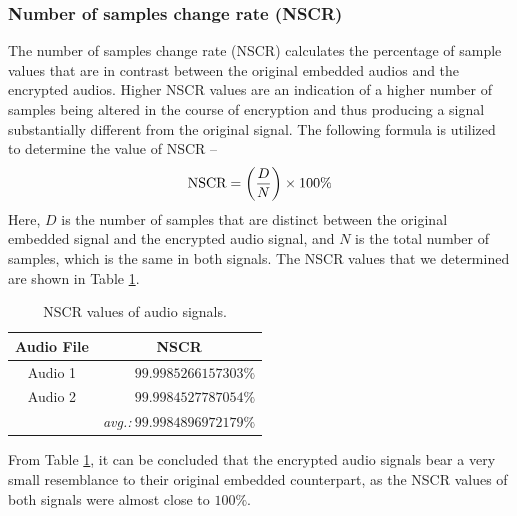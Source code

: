 \documentclass[a4paper]{cas-sc}
\begin{document}
\subsubsection{Number of samples change rate (NSCR)}
The number of samples change rate (NSCR) calculates the percentage of sample values that are in contrast between the original embedded audios and the encrypted audios. Higher NSCR values are an indication of a higher number of samples being altered in the course of encryption and thus producing a signal substantially different from the original signal. The following formula is utilized to determine the value of NSCR --
\begin{equation}
    \textcolor{black}{\text{NSCR}=\left(\frac{D}{N}\right)\times100\%}
\end{equation}
Here, $D$ is the number of samples that are distinct between the original embedded signal and the encrypted audio signal, and $N$ is the total number of samples, which is the same in both signals. The NSCR values that we determined are shown in Table \ref{table:nscr}.
\begin{table}[pos=h]
    \begin{center}
        \caption{NSCR values of audio signals.}
        \begin{tabular}{cr}
            \hline
            \multicolumn{1}{c|}{Audio File} & \multicolumn{1}{c}{NSCR}                     \\ \hline
            \multicolumn{1}{c|}{Audio 1}    & $99.9985266157303\%$                         \\ %
            \multicolumn{1}{c|}{Audio 2}    & $99.9984527787054\%$                         \\ \hline
                                            & \textit{avg.:}$\mathbf{~99.9984896972179\%}$
        \end{tabular}
        \label{table:nscr}
    \end{center}
\end{table}

From Table \ref{table:nscr}, it can be concluded that the encrypted audio signals bear a very small resemblance to their original embedded counterpart, as the NSCR values of both signals were almost close to $100\%$.
\end{document}
